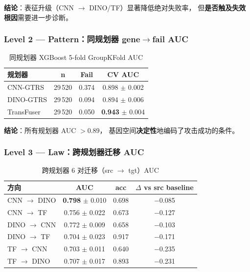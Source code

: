 \documentclass[a4paper,12pt,fontset=fandol]{ctexart}
\newcommand{\planner}[1]{\textsf{#1}}
\begin{document}
{\noindent\textbf{结论}：表征升级（CNN $\to$ DINO/TF）显著降低绝对失败率，
但\textbf{是否触及失效根因}需要进一步诊断。

\subsubsection{Level 2 — Pattern：同规划器 gene$\to$fail AUC}

\begin{table}[H]
\centering
\small
\caption{同规划器 XGBoost 5-fold GroupKFold AUC}
\label{tab:pattern}
\begin{tabular}{lccc}
\toprule
\textbf{规划器} & \textbf{n} & \textbf{Fail} & \textbf{CV AUC} \\
\midrule
\planner{CNN-GTRS}   & 29\,520 & 0.374 & 0.898 $\pm$ 0.002 \\
\planner{DINO-GTRS}  & 29\,520 & 0.094 & 0.894 $\pm$ 0.006 \\
\planner{TransFuser} & 29\,520 & 0.050 & \textbf{0.943} $\pm$ 0.004 \\
\bottomrule
\end{tabular}
\end{table}

\noindent\textbf{结论}：所有规划器 AUC $> 0.89$，
基因空间\textbf{决定性}地编码了攻击成功的条件。

\subsubsection{Level 3 — Law：跨规划器迁移 AUC}

\begin{table}[H]
\centering
\small
\caption{跨规划器 6 对迁移（src $\to$ tgt）AUC}
\label{tab:law}
\begin{tabular}{lccc}
\toprule
\textbf{方向} & \textbf{AUC} & \textbf{acc} & \textbf{$\Delta$ vs src baseline} \\
\midrule
\planner{CNN}  $\to$ \planner{DINO} & \textbf{0.798} $\pm$ 0.010 & 0.698 & $-$0.085 \\
\planner{CNN}  $\to$ \planner{TF}   & 0.756 $\pm$ 0.022 & 0.673 & $-$0.127 \\
\planner{DINO} $\to$ \planner{CNN}  & 0.772 $\pm$ 0.009 & 0.658 & $-$0.103 \\
\planner{DINO} $\to$ \planner{TF}   & 0.704 $\pm$ 0.023 & 0.917 & $-$0.171 \\
\planner{TF}   $\to$ \planner{CNN}  & 0.703 $\pm$ 0.011 & 0.640 & $-$0.235 \\
\planner{TF}   $\to$ \planner{DINO} & 0.707 $\pm$ 0.017 & 0.893 & $-$0.231 \\
\bottomrule
\end{tabular}
\end{table}

}
\end{document}
